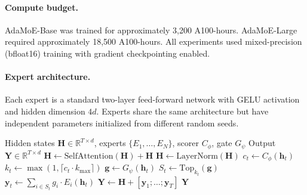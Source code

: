 \documentclass[11pt,a4paper]{article}
\newcommand{\R}{\mathbb{R}}
\begin{document}
\paragraph{Compute budget.}
AdaMoE-Base was trained for approximately 3,200 A100-hours.
AdaMoE-Large required approximately 18,500 A100-hours.
All experiments used mixed-precision (bfloat16) training with gradient checkpointing enabled.

\paragraph{Expert architecture.}
Each expert is a standard two-layer feed-forward network with GELU activation and
hidden dimension $4d$.
Experts share the same architecture but have independent parameters initialized from
different random seeds.

\begin{algorithm}[t]
\caption{AdaMoE Forward Pass (Single Layer)}
\label{alg:forward}
\begin{algorithmic}[1]
\Require Hidden states $\mathbf{H} \in \R^{T \times d}$, experts $\{E_1, \ldots, E_N\}$, scorer $C_\phi$, gate $G_\psi$
\Ensure Output $\mathbf{Y} \in \R^{T \times d}$
\State $\mathbf{H} \gets \text{SelfAttention}(\mathbf{H}) + \mathbf{H}$ 
\State $\mathbf{H} \gets \text{LayerNorm}(\mathbf{H})$
  \State $c_t \gets C_\phi(\mathbf{h}_t)$ 
  \State $k_t \gets \max(1, \lceil c_t \cdot k_{\max} \rceil)$ 
  \State $\mathbf{g} \gets G_\psi(\mathbf{h}_t)$ 
  \State $S_t \gets \text{Top}_{k_t}(\mathbf{g})$ 
  \State $\mathbf{y}_t \gets \sum_{i \in S_t} g_i \cdot E_i(\mathbf{h}_t)$ 
\EndFor
\State $\mathbf{Y} \gets \mathbf{H} + [\mathbf{y}_1; \ldots; \mathbf{y}_T]$ 
\State \Return $\mathbf{Y}$
\end{algorithmic}
\end{algorithm}
\end{document}
